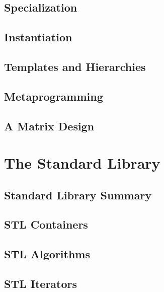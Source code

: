 \documentclass[12pt,letterpaper]{book}
\theoremstyle{definition}
\theoremstyle{remark}
\begin{document}
\chapter{Specialization}


\chapter{Instantiation}


\chapter{Templates and Hierarchies}


\chapter{Metaprogramming}


\chapter{A Matrix Design}


\part{The Standard Library}

\chapter{Standard Library Summary}


\chapter{STL Containers}


\chapter{STL Algorithms}


\chapter{STL Iterators}
\end{document}
